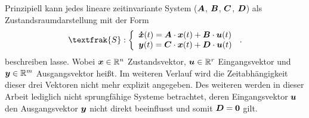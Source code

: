 Prinzipiell kann jedes lineare zeitinvariante System 
($\boldsymbol{A}$, $\boldsymbol{B}$, $\boldsymbol{C}$, $\boldsymbol{D}$) als Zustandsraumdarstellung mit der Form
\begin{equation}
\textfrak{S} 
: \left\{ \begin{array}{ll}
\bs{\dot{x}}(t) = \bs{A}\cdot \bs{x}(t) + \bs{B}\cdot \bs{u}(t) \\
\bs{y}(t) = \bs{C}\cdot \bs{x}(t) + \bs{D}\cdot \bs{u}(t)
\end{array}
\right.\,.
\end{equation}
beschreiben lasse. Wobei $\boldsymbol{x} \in \mathbb{R}^n$ Zustandsvektor, $\boldsymbol{u} \in \mathbb{R}^r$ Eingangsvektor und $\boldsymbol{y} \in \mathbb{R}^m$ Ausgangsvektor heißt. Im weiteren Verlauf wird die Zeitabhängigkeit dieser drei Vektoren nicht mehr explizit angegeben. Des weiteren werden in dieser Arbeit lediglich nicht sprungfähige Systeme  betrachtet, deren Eingangsvektor $\boldsymbol{u}$  den Ausgangsvektor $\boldsymbol{y}$ nicht direkt beeinflusst und somit $\boldsymbol{D} = \boldsymbol{0}$ gilt.

